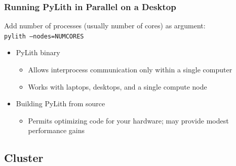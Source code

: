 \documentclass{beamer}
\newcommand{\important}[1]{{\color{red}#1}}
\begin{document}
\begin{frame}
  \frametitle{Running PyLith in Parallel on a Desktop}

  \vfill
  Add number of processes (usually number of cores) as argument:\\
  {\tt pylith \important{--nodes=NUMCORES}} 
  \vfill

  \begin{itemize}
  \item PyLith binary
    \begin{itemize}
    \item Allows interprocess communication only within
      a single computer
    \item Works with laptops, desktops, and a single compute node
    \end{itemize}
  \item Building PyLith from source
    \begin{itemize}
    \item Permits optimizing code for your hardware; may provide modest
      performance gains
    \end{itemize}
  \end{itemize}

\end{frame}


\subsection{Cluster}
\end{document}
